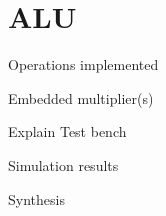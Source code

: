 

\section{ALU}

Operations implemented

Embedded multiplier(s)

Explain Test bench

Simulation results

Synthesis

